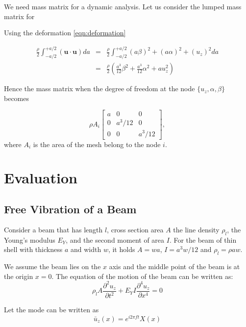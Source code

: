 \documentclass{article}
\begin{document}
We need mass matrix for a dynamic analysis.
%
Let us consider the lumped mass matrix for 

Using the deformation \eqref{eqn:deformation} 


\begin{eqnarray}
    \frac{\rho}{2}\int^{+a/2}_{-a/2} (\mathbf{u}\cdot\mathbf{u})da 
    &=&
    \frac{\rho}{2}
    \int^{+a/2}_{-a/2}(a\beta)^2 + (a\alpha)^2 + (u_z)^2 da\\
    &=&
    \frac{\rho}{2}
    \left(
    \frac{a^3}{12}\beta^2 + \frac{a^3}{12}\alpha^2 + a u_z^2 \right)   
\end{eqnarray}

Hence the mass matrix when the degree of freedom at the node $\{u_z,\alpha,\beta\}$ becomes

\begin{equation}
    \rho A_i\left[\begin{array}{ccc}
    a & 0 & 0\\
    0 & a^3/12 & 0\\
    0 & 0 & a^3/12
    \end{array}\right],
\end{equation}
%
where $A_i$ is the area of the mesh belong to the node $i$.



\section{Evaluation}

\subsection{Free Vibration of a Beam}

Consider a beam that has length $l$, cross section area $A$ the line density $\rho_l$, the Young's modulus $E_Y$, and the second moment of area $I$. 
%
For the beam of thin shell with thickness $a$ and width $w$, it holds $A=wa$, $I=a^3w/12$ and $\rho_l =\rho a w$.


We assume the beam lies on the $x$ axis and the middle point of the beam is at the origin $x=0$.
%
The equation of the motion of the beam can be written as:
\begin{equation}
    \rho_l A \frac{\partial^2 u_z}{\partial t^2} + E_Y I \frac{\partial^4 u_z}{\partial x^4} = 0
\end{equation}

Let the mode can be written as
%
\begin{equation}
\bar{u}_z(x)=
e^{i 2\pi f t} X(x)
\end{equation}
\end{document}
